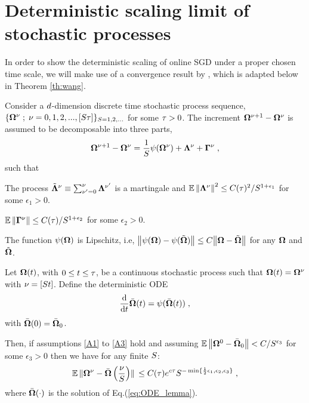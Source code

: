 \section{Deterministic scaling limit of stochastic processes}\label{app:theorem}

In order to show the deterministic scaling of online SGD under a proper chosen time scale, we will make use of a convergence result by \cite{wang_2018, wang_2019}, which is adapted below in Theorem \ref{th:wang}.

\begin{theorem}  \label{th:wang} Consider a $\inp$-dimension discrete time stochastic process sequence, $   \{  \Om^\i  \; ; \; \i = 0, 1, 2, ..., [\S \T ] \}_{\S = 1, 2, ...}$ for some $ \T > 0$. The increment $\Om^{\i + 1} - \Om^\i $ is assumed to be decomposable into three parts, 
\begin{equation}
\label{eq:process_3parts}
    \Om^{\i + 1} - \Om^\i = \frac{1}{\S} \psi (  \Om^\i     ) + \bm{\Lambda}^\i + 
    \bm{\Gamma}^\i     \;,
\end{equation}
such that 
\begin{assump}
\label{A1}
The process $\tilde{\bm{\Lambda}}^\i \equiv \sum_{\nu' = 0}^\i \bm{\Lambda}^{\nu'}$ is a martingale and $\E \norm{ \bm{\Lambda}^\i }^{2}  \le C(\T)^2 / \S^{1 + \epsilon_1}$ for some $\epsilon_1 > 0$.
\end{assump}
\begin{assump}
\label{A2}
$ \E  \norm{ \bm{\Gamma}^\i  } \le C(\T) / \S^{1 + \epsilon_2}$ for some $\epsilon_2 > 0$.
\end{assump}
\begin{assump}
\label{A3}
 The function $\psi (  \Om )$ is Lipschitz, i.e, $ \norm{ \psi (  \Om ) - \psi (  \tilde{\Om} )  } \le C  \norm{ \Om-\tilde{\Om}}$ for any $\Om$ and $\tilde{\Om}$.
\end{assump}

Let $\Om(\alp)$, with $ 0 \le \alp \le \T $, be a continuous stochastic process such that $ \Om(\alp) = \bm{\Om}^\i$ with $\i = [\S\alp]$. Define the deterministic ODE
\begin{equation}
\label{eq:ODE_lemma}
   \dv{\alp}  \bar{\Om} (\alp) = \psi ( \bar{\Om}(\alp)   ) \;,
\end{equation}
with $  \bar{\bm{\Om}}(0)  =  \bar{\Om}_0  $.

Then, if assumptions \ref{A1} to \ref{A3} hold and assuming $  \E \norm{\Om^0 - \bar{\Om}_0 }  < C / \S^{\epsilon_3} $ for some $ \epsilon_3 > 0$ then we have for any finite $\S$:
\begin{equation}\label{eq:nonasymp_bound}
\E\norm*{\Om^\i -\bar{\Om} \left( \frac{\i}{\S} \right)  } \le C(\T) e^{c\T}   
     \S^{ -\min \{ \frac{1}{2} \epsilon_1 , \epsilon_2 , \epsilon_3 \}  }\;,
\end{equation}
where $\bar{\Om} (\cdot)$ is the solution of Eq.(\ref{eq:ODE_lemma}).


\end{theorem}
